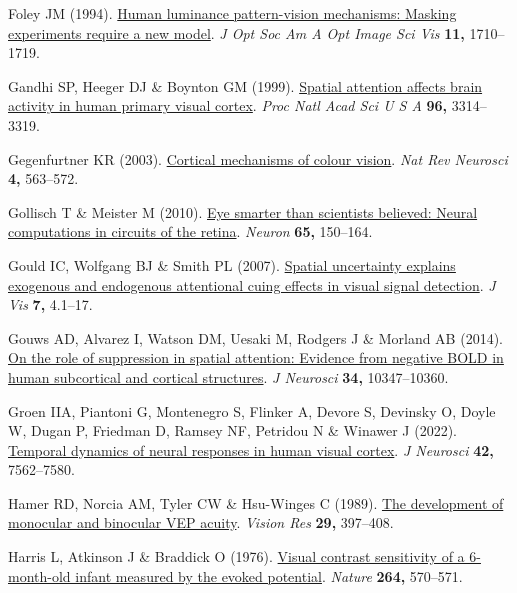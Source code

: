 \documentclass[
  letterpaper,
  DIV=11,
  numbers=noendperiod]{scrartcl}
\newlength{\cslhangindent}
\newenvironment{CSLReferences}[2] %
 {\begin{list}{}{%
  \setlength{\itemindent}{0pt}
  \setlength{\leftmargin}{0pt}
  \setlength{\parsep}{0pt}
  \ifodd #1
   \setlength{\leftmargin}{\cslhangindent}
   \setlength{\itemindent}{-1\cslhangindent}
  \fi
  \setlength{\itemsep}{#2\baselineskip}}}
 {\end{list}}
\begin{document}
\begin{CSLReferences}{1}{1}
Foley JM (1994). \href{https://doi.org/10.1364/josaa.11.001710}{Human
luminance pattern-vision mechanisms: Masking experiments require a new
model}. \emph{J Opt Soc Am A Opt Image Sci Vis} \textbf{11,} 1710--1719.

Gandhi SP, Heeger DJ \& Boynton GM (1999).
\href{https://doi.org/10.1073/pnas.96.6.3314}{Spatial attention affects
brain activity in human primary visual cortex}. \emph{Proc Natl Acad Sci
U S A} \textbf{96,} 3314--3319.

Gegenfurtner KR (2003). \href{https://doi.org/10.1038/nrn1138}{Cortical
mechanisms of colour vision}. \emph{Nat Rev Neurosci} \textbf{4,}
563--572.

Gollisch T \& Meister M (2010).
\href{https://doi.org/10.1016/j.neuron.2009.12.009}{Eye smarter than
scientists believed: Neural computations in circuits of the retina}.
\emph{Neuron} \textbf{65,} 150--164.

Gould IC, Wolfgang BJ \& Smith PL (2007).
\href{https://doi.org/10.1167/7.13.4}{Spatial uncertainty explains
exogenous and endogenous attentional cuing effects in visual signal
detection}. \emph{J Vis} \textbf{7,} 4.1--17.

Gouws AD, Alvarez I, Watson DM, Uesaki M, Rodgers J \& Morland AB
(2014). \href{https://doi.org/10.1523/JNEUROSCI.0164-14.2014}{On the
role of suppression in spatial attention: Evidence from negative BOLD in
human subcortical and cortical structures}. \emph{J Neurosci}
\textbf{34,} 10347--10360.

Groen IIA, Piantoni G, Montenegro S, Flinker A, Devore S, Devinsky O,
Doyle W, Dugan P, Friedman D, Ramsey NF, Petridou N \& Winawer J (2022).
\href{https://doi.org/10.1523/JNEUROSCI.1812-21.2022}{Temporal dynamics
of neural responses in human visual cortex}. \emph{J Neurosci}
\textbf{42,} 7562--7580.

Hamer RD, Norcia AM, Tyler CW \& Hsu-Winges C (1989).
\href{https://doi.org/10.1016/0042-6989(89)90004-7}{The development of
monocular and binocular VEP acuity}. \emph{Vision Res} \textbf{29,}
397--408.

Harris L, Atkinson J \& Braddick O (1976).
\href{https://doi.org/10.1038/264570a0}{Visual contrast sensitivity of a
6-month-old infant measured by the evoked potential}. \emph{Nature}
\textbf{264,} 570--571.


\end{CSLReferences}
\end{document}
